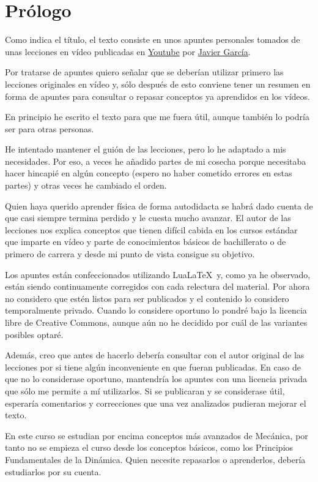 %

\chapter{Prólogo}
Como indica el título, el texto consiste en unos apuntes personales tomados
de unas lecciones en vídeo publicadas en
\href{https://www.youtube.com/playlist?list=PLAnA8FVrBl8C-2TTrbArT1g04RJEckRMG}
{Youtube}
por \href{https://www.patreon.com/ceamontilivi/}{Javier García}.

Por tratarse de apuntes quiero señalar que se deberían utilizar primero
las lecciones originales en vídeo y, sólo después de esto conviene tener
un resumen en forma de apuntes para consultar o repasar conceptos ya
aprendidos en los vídeos.

En principio he escrito el texto para que me fuera útil, aunque también lo
podría ser para otras personas.

He intentado mantener el guión de las lecciones, pero lo he adaptado a mis
necesidades. Por eso, a veces he añadido partes de mi cosecha porque necesitaba
hacer hincapié en algún concepto (espero no haber cometido errores en estas
partes) y otras veces he cambiado el orden.

Quien haya querido aprender física de forma autodidacta se habrá
dado cuenta de que casi siempre termina perdido y le cuesta mucho avanzar.
El autor de las lecciones nos explica conceptos que tienen difícil cabida
en los cursos estándar que imparte en vídeo y parte de conocimientos básicos
de bachillerato o de primero de carrera y desde mi punto de vista consigue
su objetivo.

Los apuntes están confeccionados utilizando Lua\LaTeX\ y, como ya he observado,
están siendo continuamente corregidos con cada relectura del material.
Por ahora no considero que estén listos para ser publicados y el contenido
lo considero temporalmente privado. Cuando lo considere oportuno lo pondré
bajo la licencia libre de Creative Commons, aunque aún no he decidido por
cuál de las variantes posibles optaré.

Además, creo que antes de hacerlo debería consultar con el autor original
de las lecciones por si tiene algún inconveniente en que fueran publicadas.
En caso de que no lo considerase oportuno, mantendría los apuntes con una
licencia privada que sólo me permite a mí utilizarlos. Si se publicaran
y se considerase útil, esperaría comentarios y correcciones que una
vez analizados pudieran mejorar el texto.

En este curso se estudian por encima conceptos más avanzados de Mecánica,
por tanto no se empieza el curso desde los conceptos básicos, como los Principios
Fundamentales de la Dinámica. Quien necesite repasarlos o aprenderlos,
debería estudiarlos por su cuenta.




 
